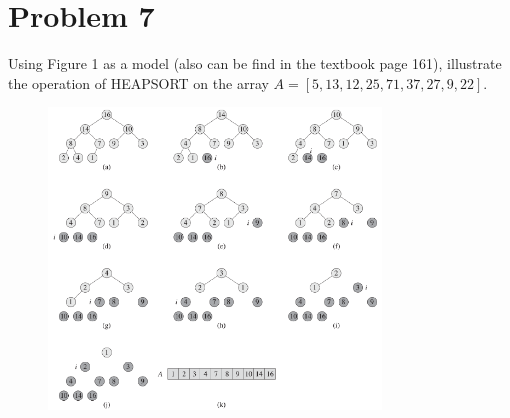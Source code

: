 \documentclass[10pt]{article}
\begin{document}
\section*{Problem 7}
Using Figure 1 as a model (also can be find in the textbook page 161), illustrate the operation of HEAPSORT on the array
$A=[5, 13, 12, 25, 71, 37, 27, 9, 22]$.
\begin{center}
  \begin{figure}[h!]
    \centering
    \includegraphics[height=8cm,keepaspectratio]{fig1.png}
  \end{figure}
\end{center}
\end{document}
